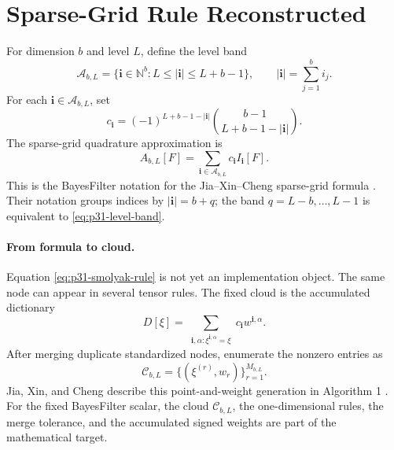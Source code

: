 \documentclass[11pt]{article}
\numberwithin{equation}{section}
\begin{document}
\section{Sparse-Grid Rule Reconstructed}
\label{sec:p31-sgq-reconstruction}

For dimension \(b\) and level \(L\), define the level band
\begin{equation}
  \mathcal A_{b,L}
  =
  \{\mathbf i\in\mathbb N^b: L\le |\mathbf i|\le L+b-1\},
  \qquad |\mathbf i|=\sum_{j=1}^b i_j.
  \label{eq:p31-level-band}
\end{equation}
For each \(\mathbf i\in\mathcal A_{b,L}\), set
\begin{equation}
  c_{\mathbf i}
  =
  (-1)^{L+b-1-|\mathbf i|}
  \binom{b-1}{L+b-1-|\mathbf i|}.
  \label{eq:p31-smolyak-coeff}
\end{equation}
The sparse-grid quadrature approximation is
\begin{equation}
  A_{b,L}[F]
  =
  \sum_{\mathbf i\in\mathcal A_{b,L}}
  c_{\mathbf i}I_{\mathbf i}[F].
  \label{eq:p31-smolyak-rule}
\end{equation}
This is the BayesFilter notation for the Jia--Xin--Cheng sparse-grid formula
\cite[Eq. 26--29]{jia2012sparsegrid}.  Their notation groups indices by
\(|\mathbf i|=b+q\); the band \(q=L-b,\ldots,L-1\) is equivalent to
\eqref{eq:p31-level-band}.

\paragraph{From formula to cloud.}
Equation \eqref{eq:p31-smolyak-rule} is not yet an implementation object.  The
same node can appear in several tensor rules.  The fixed cloud is the
accumulated dictionary
\begin{equation}
  D[\xi]
  =
  \sum_{\substack{\mathbf i,\alpha:
  \xi^{\mathbf i,\alpha}=\xi}}
  c_{\mathbf i}w^{\mathbf i,\alpha}.
  \label{eq:p31-node-dictionary}
\end{equation}
After merging duplicate standardized nodes, enumerate the nonzero entries as
\begin{equation}
  \mathcal C_{b,L}
  =
  \{(\xi^{(r)},w_r)\}_{r=1}^{M_{b,L}}.
  \label{eq:p31-fixed-cloud}
\end{equation}
Jia, Xin, and Cheng describe this point-and-weight generation in Algorithm 1
\cite[Algorithm 1]{jia2012sparsegrid}.  For the fixed BayesFilter scalar, the
cloud \(\mathcal C_{b,L}\), the one-dimensional rules, the merge tolerance, and
the accumulated signed weights are part of the mathematical target.
\end{document}
